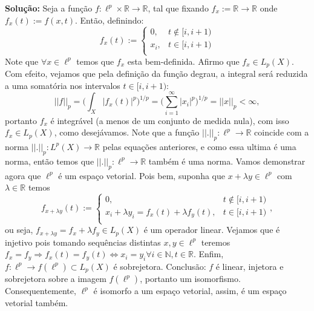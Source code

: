 \documentclass{article}
\begin{document}
\begin{enumerate}
\begin{enumerate}
				\textbf{Solução:} Seja a função $f: \ell^{p} \times \mathbb{R} \to \mathbb{R}$, tal que fixando $f_{x} := \mathbb{R} \to \mathbb{R}$ onde $f_{x}(t) := f(x, t)$. Então, definindo:
				$$
				f_{x}(t) := \left\{
				\begin{array}{cc}
				0, & t \notin [i, i+1)\\
				x_{i}, & t \in [i, i+1) \\
				\end{array}
				\right.
				$$
				Note que $\forall x \in \ell^{p}$ temos que $f_{x}$ esta bem-definida. Afirmo que $f_{x} \in L_{p}(X)$. Com efeito, vejamos que pela definição da função degrau, a integral será reduzida a uma somatória nos intervalos $t \in [i, i+1)$: 
				$$
				||f||_{p} = \Big(\int_{X}|f_x(t)|^{p}\Big)^{1/p} = \Big(\sum \limits_{i=1}^{\infty}|x_i|^{p}\Big)^{1/p} = ||x||_{p} < \infty, 
				$$
				portanto $f_{x}$ é integrável (a menos de um conjunto de medida nula), com isso $f_{x} \in L_{p}(X)$, como desejávamos. Note que a função $||.||_{p}: \ell^{p} \to \mathbb{R}$ coincide com a norma $||.||_{p}: L^{p}(X) \to \mathbb{R}$ pelas equações anteriores, e como essa ultima é uma norma, então temos que $||.||_{p}: \ell^{p} \to \mathbb{R}$ também é uma norma. Vamos demonstrar agora que $\ell^{p}$ é um espaço vetorial. Pois bem, suponha que $x + \lambda y \in \ell^{p}$ com $\lambda \in \mathbb{R}$ temos
				$$
				f_{x + \lambda y }(t) := \left\{
				\begin{array}{cc}
				0, & t \notin [i, i+1)\\
				x_{i} +\lambda y_{i} = f_{x}(t) + \lambda f_{y}(t), & t \in [i, i+1) \\
				\end{array}
				\right.,				
				$$
				ou seja, $f_{x + \lambda y } = f_{x} + \lambda f_{y } \in L_{p}(X)$ é um operador linear. Vejamos que é injetivo pois tomando sequências distintas $x, y \in \ell^{p}$ teremos $f_{x} = f_{y} \Rightarrow f_{x}(t) = f_{y}(t) \iff x_{i} = y_{i} \forall i \in \mathbb{N}, t \in \mathbb{R}$. Enfim, $f: \ell^{p} \to f(\ell^{p}) \subset L_{p}(X)$ é sobrejetora. Conclusão: $f$ é linear, injetora e sobrejetora sobre a imagem $f(\ell^{p})$, portanto um isomorfismo. Consequentemente, $\ell^{p}$ é isomorfo a um espaço vetorial, assim, é um espaço vetorial também.
				
				
				
				
		\end{enumerate}
		
	\end{enumerate}
		
\end{document}
